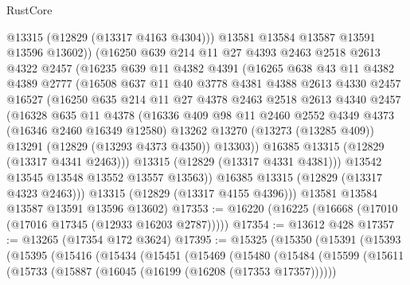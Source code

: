 \begin{lexlean}{RustCore}
\begin{coremodule}
              @13315
              (@12829 (@13317 @4163 @4304)))
            @13581
            @13584
            @13587
            @13591
            @13596
            @13602))
        (@16250
          @639
          @214
          @11
          @27
          @4393
          @2463
          @2518
          @2613
          @4322
          @2457
          (@16235
            @639
            @11
            @4382
            @4391
            (@16265
              @638
              @43
              @11
              @4382
              @4389
              @2777
              (@16508
                @637
                @11
                @40
                @3778
                @4381
                @4388
                @2613
                @4330
                @2457
                @16527
                (@16250
                  @635
                  @214
                  @11
                  @27
                  @4378
                  @2463
                  @2518
                  @2613
                  @4340
                  @2457
                  (@16328
                    @635
                    @11
                    @4378
                    (@16336
                      @409
                      @98
                      @11
                      @2460
                      @2552
                      @4349
                      @4373
                      (@16346 @2460 @16349 @12580)
                      @13262
                      @13270
                      (@13273 (@13285 @409))
                      @13291
                      (@12829 (@13293 @4373 @4350))
                      @13303))
                  @16385
                  @13315
                  (@12829 (@13317 @4341 @2463)))
                @13315
                (@12829 (@13317 @4331 @4381)))
              @13542
              @13545
              @13548
              @13552
              @13557
              @13563))
          @16385
          @13315
          (@12829 (@13317 @4323 @2463)))
        @13315
        (@12829 (@13317 @4155 @4396)))
      @13581
      @13584
      @13587
      @13591
      @13596
      @13602)
@17353 := @16220 (@16225 (@16668 (@17010 (@17016 @17345 (@12933 @16203 @2787)))))
@17354 := @13612 @428
@17357 := @13265 (@17354 @172 @3624)
@17395 := @15325
    (@15350
      (@15391
        (@15393
          (@15395
            (@15416
              (@15434
                (@15451
                  (@15469
                    (@15480
                      (@15484
                        (@15599
                          (@15611
                            (@15733 (@15887 (@16045 (@16199 (@16208 (@17353 @17357))))))

\end{coremodule}
\end{lexlean}
